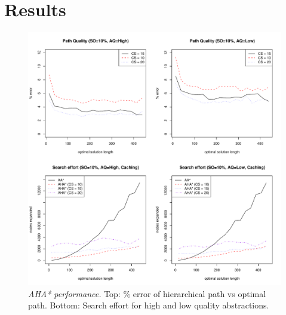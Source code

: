 \section{Results}


\begin{figure}[htbp]
       \caption{\emph{AHA* performance.} Top: \% error of hierarchical path vs optimal path. Bottom: Search effort for high and low quality abstractions. }
       \begin{center}
                       \includegraphics[scale=0.37]{diagrams/allgraphs.pdf}
       \end{center}
       \label{aha-fig:allgraphs}
\end{figure}



